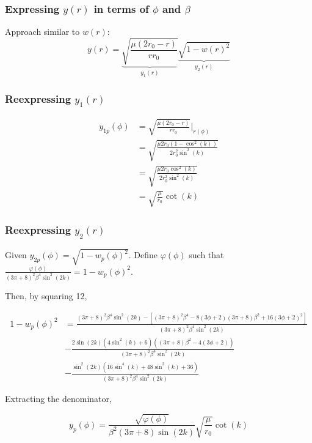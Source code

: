 \documentclass{beamer}
\begin{document}
\begin{frame}
    \frametitle{Expressing $y(r)$ in terms of $\phi$ and $\beta$}

    Approach similar to $w(r)$:
    $$
    y(r)=\underbrace{\sqrt{\frac{\mu(2r_0-r)}{rr_0}}}_{y_1(r)}\underbrace{\sqrt{1-w(r)^2}}_{y_2(r)}
    $$
\end{frame}

\begin{frame}
    \frametitle{Reexpressing $y_1(r)$}

    \begin{align}
        y_{1p}(\phi)&=\sqrt{\frac{\mu(2r_0-r)}{rr_0}}\bigg\rvert_{r(\phi)}\\
        &=\sqrt{\frac{\mu 2r_0(1-\cos^2(k))}{2r_0^2\sin^2(k)}}\\
        &=\sqrt{\frac{\mu 2r_0 \cos^2(k)}{2r_0^2 \sin^2(k)}}\\
        &=\sqrt{\frac{\mu}{r_0}}\cot(k)
    \end{align}
\end{frame}

\begin{frame}
    \frametitle{Reexpressing $y_2(r)$}

    Given $y_{2p}(\phi)=\sqrt{1-w_p(\phi)^2}$.\newline
    Define $\varphi(\phi)$ such that $\frac{\varphi(\phi)}{(3\pi+8)^2\beta^4\sin^2(2k)}=1-w_p(\phi)^2$.

    Then, by squaring 12,

    {\tiny
        \begin{align*}
            1-w_p(\phi)^2&=\frac{(3\pi+8)^2\beta^4\sin^2(2k)-\left[(3\pi+8)^2\beta^4-8(3\phi+2)(3\pi+8)\beta^2+16(3\phi+2)^2\right]}{(3\pi+8)^2\beta^4\sin^2(2k)}\\
            &-\frac{2\sin(2k)(4\sin^2(k)+6)((3\pi+8)\beta^2-4(3\phi+2))}{(3\pi+8)^2\beta^4\sin^2(2k)}\\
            &-\frac{\sin^2(2k)(16\sin^4(k)+48\sin^2(k)+36)}{(3\pi+8)^2\beta^4\sin^2(2k)}
        \end{align*}
    }

    Extracting the denominator,

    $$
    y_p(\phi)=\frac{\sqrt{\varphi(\phi)}}{\beta^2(3\pi+8)\sin(2k)}\sqrt{\frac{\mu}{r_0}}\cot(k)
    $$

\end{frame}
\end{document}
